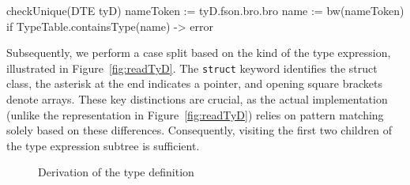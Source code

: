 \begin{codeblock}
    checkUnique(DTE tyD) {
        nameToken := tyD.fson.bro.bro
        name := bw(nameToken)
        if TypeTable.containsType(name) -> { error }
    }
\end{codeblock}
Subsequently, we perform a case split based on the kind of the
type expression, illustrated in Figure~\ref{fig:readTyD}.
The \verb+struct+ keyword identifies the struct class, the asterisk at the end indicates a pointer, and opening square brackets denote arrays.
These key distinctions are crucial, as the actual implementation (unlike the representation in Figure~\ref{fig:readTyD}) relies on pattern matching solely based on these differences.
Consequently, visiting the first two children of the type expression subtree is sufficient.
\begin{figure}[h]
    \centering
    \caption{Derivation of the type definition}
    \label{fig:tyd}
\end{figure}

